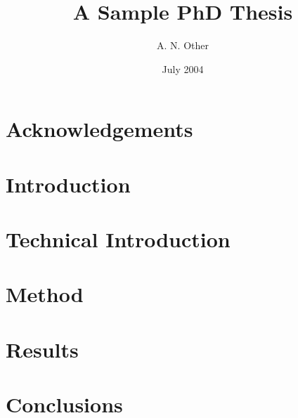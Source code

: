 \documentclass[a4paper]{mythesis}
\begin{document}
\title{A Sample PhD Thesis}
\author{A. N. Other}
\date{July 2004}

\maketitle

\tableofcontents
\listoffigures
\listoftables

\chapter*{Acknowledgements}

\begin{abstract}
\end{abstract}


\chapter{Introduction}
\label{ch:intro}

\chapter{Technical Introduction}
\label{ch:techintro}

\chapter{Method}
\label{ch:method}

\chapter{Results}
\label{ch:results}

\chapter{Conclusions}
\label{ch:conc}



\end{document}
